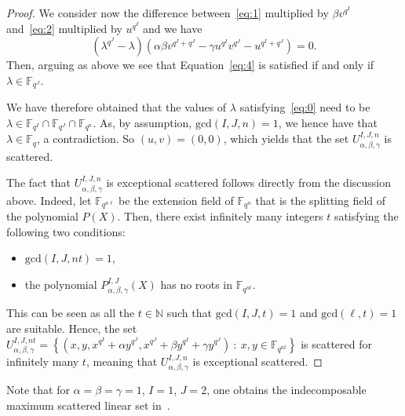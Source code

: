 \documentclass[11pt]{article}
\theoremstyle{definition}
\numberwithin{equation}{section}
\begin{document}
\begin{proof}
We consider now the difference between~\eqref{eq:1} multiplied by $\beta v^{q^I}$ and~\eqref{eq:2} multiplied by $u^{q^I}$ and we have
\begin{equation}
\label{eq:4}
    \left(\lambda^{q^J} - \lambda\right)\left(\alpha\beta v^{q^I + q^J} -\gamma u^{q^I}v^{q^J} - u^{q^I + q^J}\right) = 0.
\end{equation}
Then, arguing as above we see that Equation~\eqref{eq:4} is satisfied if and only if $\lambda\in \mathbb{F}_{q^J}$.

We have therefore obtained that the values of $\lambda$ satisfying~\eqref{eq:0}
need to be $\lambda\in \mathbb{F}_{q^I}\cap \mathbb{F}_{q^J}\cap \mathbb{F}_{q^n}$. As, by assumption, $\mathrm{gcd}(I,J,n)=1$, we hence have that $\lambda\in \mathbb{F}_q$, a contradiction. So $(u,v)=(0,0)$, which yields that the set $U_{\alpha, \beta, \gamma}^{I,J,n}$ is scattered.

The fact that $U_{\alpha, \beta, \gamma}^{I,J,n}$ is exceptional scattered follows directly from the discussion above. Indeed, let $\mathbb{F}_{q^{n\ell}}$ be the extension field of $\mathbb{F}_{q^n}$ that is the splitting field of the polynomial $P(X)$. Then, there exist infinitely many integers $t$ satisfying the following two conditions:
\begin{itemize}
    \item $\mathrm{gcd}(I,J,nt)=1$,
    \item the polynomial $P^{I,J}_{\alpha,\beta,\gamma}(X)$ has no roots in $\mathbb{F}_{q^{nt}}$.
\end{itemize}
 This can be seen as all the $t\in \mathbb{N}$ such that $\mathrm{gcd}(I,J,t)=1$ and $\mathrm{gcd}(\ell,t)=1$ are suitable. Hence, the set $U_{\alpha, \beta, \gamma}^{I,J,nt} = \left\{\left(x,y,x^{q^I}+\alpha y^{q^J},x^{q^J}+\beta y^{q^I} + \gamma y^{q^J}\right) \ : \ x,y\in \mathbb{F}_{q^{nt}}\right\}$ is scattered for infinitely many $t$, meaning that $U_{\alpha, \beta, \gamma}^{I,J,n}$ is exceptional scattered. 
\end{proof}
Note that for $\alpha=\beta=\gamma=1$, $I=1$, $J=2$,
one obtains the indecomposable maximum scattered linear set in~\cite{BMN2022}.
\end{document}
